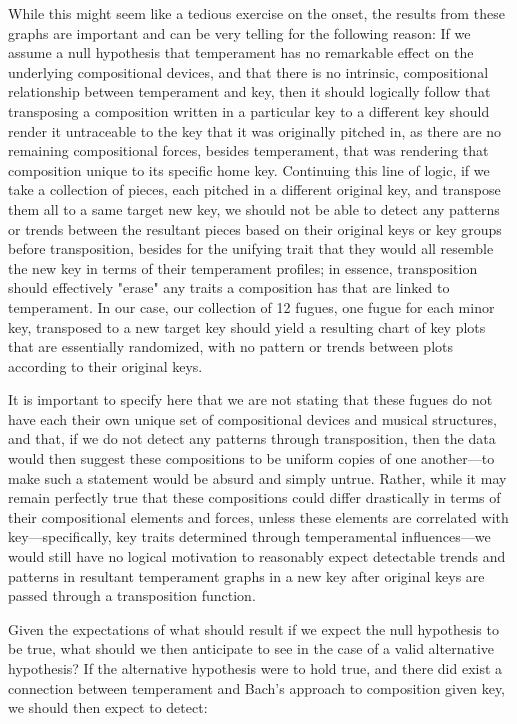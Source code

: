 While this might seem like a tedious exercise on the onset, the results
from these graphs are important and can be very telling for the
following reason: If we assume a null hypothesis that temperament has no
remarkable effect on the underlying compositional devices, and that
there is no intrinsic, compositional relationship between temperament
and key, then it should logically follow that transposing a composition
written in a particular key to a different key should render it
untraceable to the key that it was originally pitched in, as there are
no remaining compositional forces, besides temperament, that was
rendering that composition unique to its specific home key. Continuing
this line of logic, if we take a collection of pieces, each pitched in a
different original key, and transpose them all to a same target new key,
we should not be able to detect any patterns or trends between the
resultant pieces based on their original keys or key groups before
transposition, besides for the unifying trait that they would all
resemble the new key in terms of their temperament profiles; in essence,
transposition should effectively "erase" any traits a composition has
that are linked to temperament. In our case, our collection of 12
fugues, one fugue for each minor key, transposed to a new target key
should yield a resulting chart of key plots that are essentially
randomized, with no pattern or trends between plots according to their
original keys.

It is important to specify here that we are not stating that these
fugues do not have each their own unique set of compositional devices
and musical structures, and that, if we do not detect any patterns
through transposition, then the data would then suggest these
compositions to be uniform copies of one another---to make such a
statement would be absurd and simply untrue. Rather, while it may remain
perfectly true that these compositions could differ drastically in terms
of their compositional elements and forces, unless these elements are
correlated with key---specifically, key traits determined through
temperamental influences---we would still have no logical motivation
to reasonably expect detectable trends and patterns in resultant
temperament graphs in a new key after original keys are passed through a
transposition function.

Given the expectations of what should result if we expect the null
hypothesis to be true, what should we then anticipate to see in the case
of a valid alternative hypothesis? If the alternative hypothesis were to
hold true, and there did exist a connection between temperament and
Bach's approach to composition given key, we should then expect to
detect:

